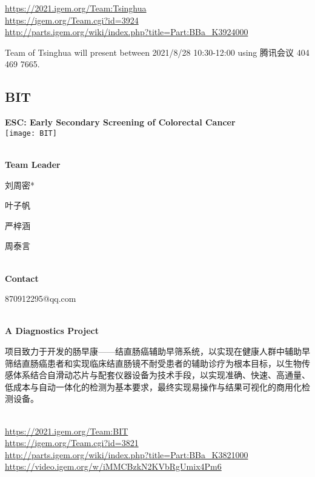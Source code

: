 \url{https://2021.igem.org/Team:Tsinghua }\\
\url{https://igem.org/Team.cgi?id=3924 }\\
\url{http://parts.igem.org/wiki/index.php?title=Part:BBa_K3924000 }\\


\vfill{}









Team of Tsinghua will present between     2021/8/28 10:30-12:00    using 腾讯会议 404 469 7665.
\newpage


\subsection{\textcolor{Blu}{ BIT } }
\vspace{5mm}
\begin{center}
\large{
  \textbf{ ESC: Early Secondary Screening of Colorectal Cancer }\\
  \texttt{[image: BIT]}
}
\end{center}
\textbf{\\Team Leader}

  刘周密*

  叶子帆

  严梓涵

  周泰言


\textbf{\\Contact}

  870912295@qq.com


\textbf{\\A Diagnostics Project\\}\begin{spacing}{1.5}

项目致力于开发的肠早康——结直肠癌辅助早筛系统，以实现在健康人群中辅助早筛结直肠癌患者和实现临床结直肠镜不耐受患者的辅助诊疗为根本目标，以生物传感体系结合自滑动芯片与配套仪器设备为技术手段，以实现准确、快速、高通量、低成本与自动一体化的检测为基本要求，最终实现易操作与结果可视化的商用化检测设备。\end{spacing}
\\

\url{https://2021.igem.org/Team:BIT }\\
\url{https://igem.org/Team.cgi?id=3821 }\\
\url{http://parts.igem.org/wiki/index.php?title=Part:BBa_K3821000 }\\
\url{https://video.igem.org/w/iMMCBzkN2KVbRgUmix4Pm6 }\\

